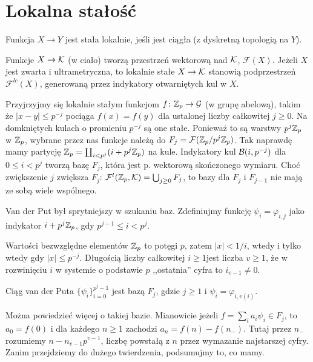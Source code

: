 \section{Lokalna stałość} %
\begin{definicja}
	Funkcja $X \to Y$ jest stała lokalnie, jeśli jest ciągła (z dyskretną topologią na $Y$).
\end{definicja}

Funkcje $X \to \mathcal K$ (w ciało) tworzą przestrzeń wektorową nad $\mathcal K$, $\mathcal F(X)$.
Jeżeli $X$ jest zwarta i ultrametryczna, to lokalnie stałe $X \to \mathcal K$ stanowią podprzestrzeń $\mathcal F^{lc}(X)$, generowaną przez indykatory otwarniętych kul w $X$.

Przyjrzyjmy się lokalnie stałym funkcjom $f \colon \mathbb Z_p \to \mathcal G$ (w grupę abelową), takim że $|x-y| \le p^{-j}$ pociąga $f(x) = f(y)$ dla ustalonej liczby całkowitej $j \ge 0$.
Na domkniętych kulach o promieniu $p^{-j}$ są one stałe.
Ponieważ to są warstwy $p^j\mathbb Z_p$ w $\mathbb Z_p$, wybrane przez nas funkcje należą do $F_j = \mathcal F(\mathbb Z_p/p^j\mathbb Z_p)$.
Tak naprawdę mamy partycję $\mathbb Z_p = \coprod_{i < p^j} (i+ p^j\mathbb Z_p)$ na kule.
Indykatory kul $\mathcal B(i, p^{-j})$ dla $0 \le i < p^j$ tworzą bazę $F_j$, która jest p. wektorową skończonego wymiaru.
Choć zwiększenie $j$ zwiększa $F_j$: $\mathcal F^l(\mathbb Z_p, \mathcal K) = \bigcup_{j \ge 0} F_j$, to bazy dla $F_j$ i $F_{j-1}$ nie mają ze sobą wiele wspólnego.

Van der Put był sprytniejszy w szukaniu baz.
Zdefiniujmy funkcję $\psi_i = \varphi_{i,j}$ jako indykator $i + p^j\mathbb Z_p$, gdy $p^{j-1} \le i < p^j$.

Wartości bezwzględne elementów $\mathbb Z_p$ to potęgi $p$, zatem $|x| < 1/i$, wtedy i tylko wtedy gdy $|x| \le p^{-j}$.
{Długością} liczby całkowitej $i \ge 1$jest liczba $v \ge 1$, że w rozwinięciu $i$ w systemie o podstawie $p$ ,,ostatnia'' cyfra to $i_{v-1} \neq 0$. 

\begin{fakt}[i definicja]
	Ciąg van der Puta $\{\psi_i\}_{i=0}^{p^j-1}$ jest bazą $F_j$, gdzie $j \ge 1$ i $\psi_i = \varphi_{i, v(i)}$.
\end{fakt}

Można powiedzieć więcej o takiej bazie. Mianowicie jeżeli $f = \sum_i a_i \psi_i \in F_j$, to $a_0 = f(0)$ i dla każdego $n \ge 1$ zachodzi $a_n = f(n) - f(n_-)$.
Tutaj przez $n_-$ rozumiemy $n - n_{v-1}p^{v-1}$, liczbę powstałą z $n$ przez wymazanie najstarszej cyfry.
Zanim przejdziemy do dużego twierdzenia, podsumujmy to, co mamy.

